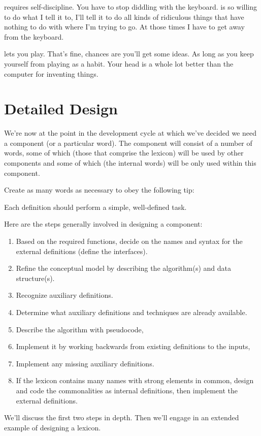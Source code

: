 \begin{interview}
\begin{tfquot}
\Forth{} requires self-discipline. You have to stop diddling with the
keyboard. \Forth{} is so willing to do what I tell it to, I'll tell it to
do all kinds of ridiculous things that have nothing to do with where I'm
trying to go. At those times I have to get away from the keyboard.

\Forth{} lets you play. That's fine, chances are you'll get some ideas. As
long as you keep yourself from playing as a habit. Your head is a whole lot
better than the computer for inventing things.
\end{tfquot}
\end{interview}%

\section{Detailed Design}%

We're now at the point in the development cycle at which we've decided
we need a component (or a particular word). The component will consist
of a number of words, some of which (those that comprise the lexicon) will
be used by other components and some of which (the internal words) will
be only used within this component.

Create as many words as necessary to obey the following tip:

\begin{tip}
Each definition should perform a simple, well-defined task.
\end{tip}%
Here are the steps generally involved in designing a component:
\begin{enumerate}
\item Based on the required functions, decide on the names and syntax for the
   external definitions (define the interfaces).
\item Refine the conceptual model by describing the algorithm(s) and data
   structure(s).
\item Recognize auxiliary definitions.
\item Determine what auxiliary definitions and techniques are already available.
\item Describe the algorithm with pseudocode,
\item Implement it by working backwards from existing definitions to the inputs,
\item Implement any missing auxiliary definitions.
\item If the lexicon contains many names with strong elements in common,
   design and code the commonalities as internal definitions, then implement
   the external definitions.
\end{enumerate}%
We'll discuss the first two steps in depth. Then we'll engage in an
extended example of designing a lexicon.

